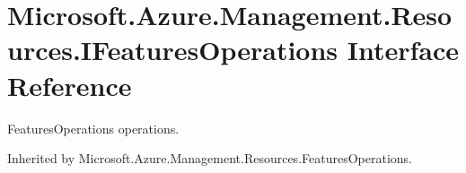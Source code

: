 \hypertarget{interface_microsoft_1_1_azure_1_1_management_1_1_resources_1_1_i_features_operations}{}\section{Microsoft.\+Azure.\+Management.\+Resources.\+I\+Features\+Operations Interface Reference}
\label{interface_microsoft_1_1_azure_1_1_management_1_1_resources_1_1_i_features_operations}


Features\+Operations operations.  




Inherited by Microsoft.\+Azure.\+Management.\+Resources.\+Features\+Operations.

